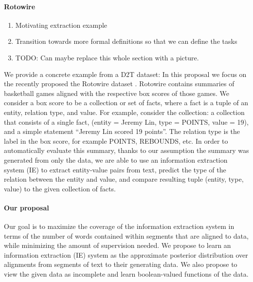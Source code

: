 \documentclass[11pt]{article}
\begin{document}
\paragraph{Rotowire}
\begin{enumerate}
\item Motivating extraction example
\item Transition towards more formal definitions so that we can define the tasks
\item TODO: Can maybe replace this whole section with a picture.
\end{enumerate}
We provide a concrete example from a D2T dataset:
In this proposal we focus on the recently proposed
the Rotowire dataset \citep{wiseman2017d2t}.
Rotowire contains summaries of basketball games aligned with the respective
box scores of those games.
We consider a box score to be a collection or set of facts,
where a fact is a tuple of an entity, relation type, and value.
For example, consider the collection:
a collection that consists of a single fact, (entity = Jeremy Lin, type = POINTS, value = 19),
and a simple statement ``Jeremy Lin scored 19 points''.
The relation type is the label in the box score, for example POINTS, REBOUNDS, etc.
In order to automatically evaluate this summary,
thanks to our assumption the summary was generated from only the data,
we are able to use an information extraction system (IE) to extract entity-value pairs
from text,
predict the type of the relation between the entity and value,
and compare resulting tuple (entity, type, value) to the given collection of facts.

\paragraph{Our proposal}
Our goal is to maximize the coverage of the information extraction system
in terms of the number of words contained within segments that are aligned to data,
while minimizing the amount of supervision needed.
We propose to learn an information extraction (IE) system as the approximate posterior distribution over 
alignments from segments of text to their generating data.
We also propose to view the given data as incomplete
and learn boolean-valued functions of the data.
\end{document}
